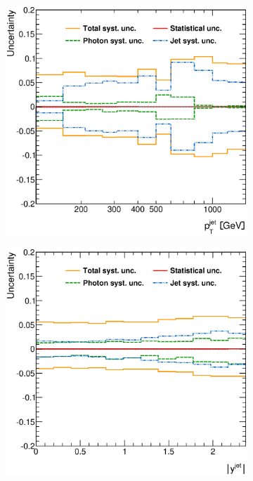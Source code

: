\documentclass[12pt, twoside]{article}
\numberwithin{equation}{section}
\numberwithin{figure}{section}
\newenvironment{changemargin}[2]{%
\begin{list}{}{%
\setlength{\topsep}{0pt}%
\setlength{\leftmargin}{#1}%
\setlength{\rightmargin}{#2}%
\setlength{\listparindent}{\parindent}%
\setlength{\itemindent}{\parindent}%
\setlength{\parsep}{\parskip}%
}%
\item[]}{\end{list}}
\begin{document}
\begin{figure}
\begin{changemargin}{-1.0cm}{-0.75cm}
\begin{changemargin}{-0.75cm}{-1.0cm}
        \vspace{0.2cm}
        \begin{subfigure}[b]{0.37\textwidth}
            \includegraphics[width=\textwidth]{./images/TotalSystematicUncertainty/TOT_SYST-104.eps}
            \subcaption{}
            \label{fig:SystUncerPtJet}
        \end{subfigure}
        \begin{subfigure}[b]{0.37\textwidth}
            \includegraphics[width=\textwidth]{./images/TotalSystematicUncertainty/TOT_SYST-105.eps}

\end{subfigure}
\end{changemargin}
\end{changemargin}
\end{figure}
\end{document}

